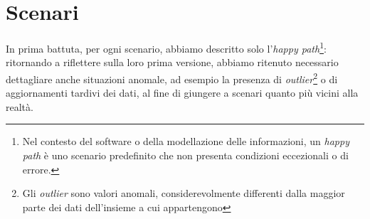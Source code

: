 \section{Scenari}
In prima battuta, per ogni scenario, abbiamo descritto solo l'\textit{happy path}\footnote{Nel contesto del software o della modellazione delle informazioni, un \textit{happy path} è uno scenario predefinito che non presenta condizioni eccezionali o di errore.}: ritornando a riflettere sulla loro prima versione, abbiamo ritenuto necessario dettagliare anche situazioni anomale, ad esempio la presenza di \textit{outlier}\footnote{Gli \textit{outlier} sono valori anomali, considerevolmente differenti dalla maggior parte dei dati dell'insieme a cui appartengono} o di aggiornamenti tardivi dei dati, al fine di giungere a scenari quanto più vicini alla realtà.










